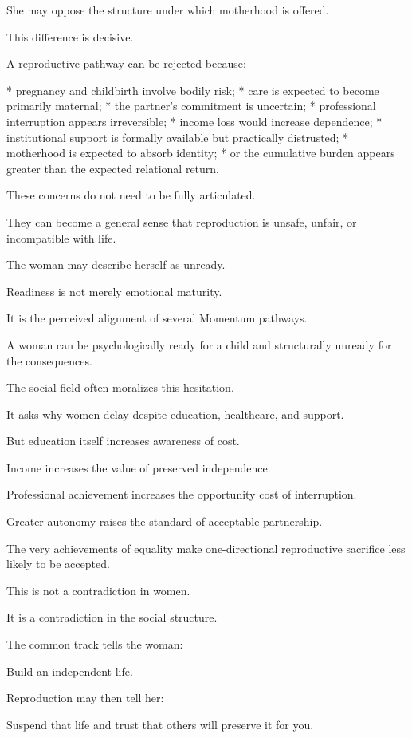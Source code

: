 She may oppose the structure under which motherhood is offered.

This difference is decisive.

A reproductive pathway can be rejected because:

* pregnancy and childbirth involve bodily risk;
* care is expected to become primarily maternal;
* the partner’s commitment is uncertain;
* professional interruption appears irreversible;
* income loss would increase dependence;
* institutional support is formally available but practically distrusted;
* motherhood is expected to absorb identity;
* or the cumulative burden appears greater than the expected relational return.

These concerns do not need to be fully articulated.

They can become a general sense that reproduction is unsafe, unfair, or incompatible with life.

The woman may describe herself as unready.

Readiness is not merely emotional maturity.

It is the perceived alignment of several Momentum pathways.

A woman can be psychologically ready for a child and structurally unready for the consequences.

The social field often moralizes this hesitation.

It asks why women delay despite education, healthcare, and support.

But education itself increases awareness of cost.

Income increases the value of preserved independence.

Professional achievement increases the opportunity cost of interruption.

Greater autonomy raises the standard of acceptable partnership.

The very achievements of equality make one-directional reproductive sacrifice less likely to be accepted.

This is not a contradiction in women.

It is a contradiction in the social structure.

The common track tells the woman:

Build an independent life.

Reproduction may then tell her:

Suspend that life and trust that others will preserve it for you.


